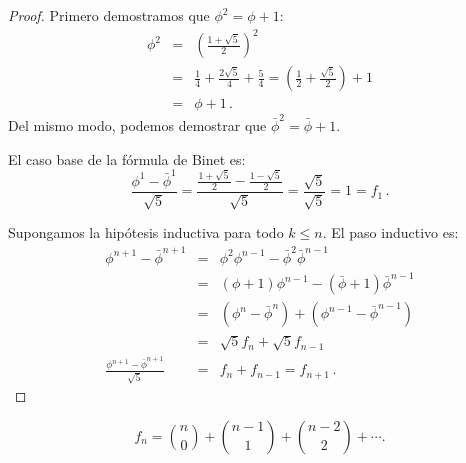 \begin{proof}
Primero demostramos que $\phi^2=\phi+1$:
\begin{eqnarray*}
\phi^2 &=& \left(\frac{1+\sqrt{5}}{2}\right)^2\\
&=& \frac{1}{4} + \frac{2\sqrt{5}}{4} + \frac{5}{4}= \left(\frac{1}{2} + \frac{\sqrt{5}}{2}\right) + 1\\
&=&\phi + 1\,.
\end{eqnarray*}
Del mismo modo, podemos demostrar que $\bar{\phi}^2=\bar{\phi}+1$.

El caso base de la fórmula de Binet es:
\[
\frac{\phi^1 - \bar{\phi}^1}{\sqrt{5}}=\frac{\frac{1+\sqrt{5}}{2}-\frac{1-\sqrt{5}}{2}}{\sqrt{5}}=\frac{\sqrt{5}}{\sqrt{5}}=1=f_1\,.
\]

Supongamos la hipótesis inductiva para todo $k\leq n$. El paso inductivo es:
\begin{eqnarray*}
\phi^{n+1} - \bar{\phi}^{n+1} &=& \phi^2\phi^{n-1} - \bar{\phi}^2\bar{\phi}^{n-1}\\
&=&(\phi+1)\phi^{n-1} - (\bar{\phi}+1)\bar{\phi}^{n-1}\\
&=&(\phi^{n} - \bar{\phi}^{n}) + (\phi^{n-1} - \bar{\phi}^{n-1})\\
&=&\sqrt{5}f_{n} + \sqrt{5}f_{n-1}\\
\frac{\phi^{n+1} - \bar{\phi}^{n+1}}{\sqrt{5}} &=& f_{n} + f_{n-1} = f_{n+1}\,.
\end{eqnarray*}
\end{proof}


\begin{theorem}
\[
f_n = \binom{n}{0} + \binom{n-1}{1} + \binom{n-2}{2} + \cdots.
\]
\end{theorem}

